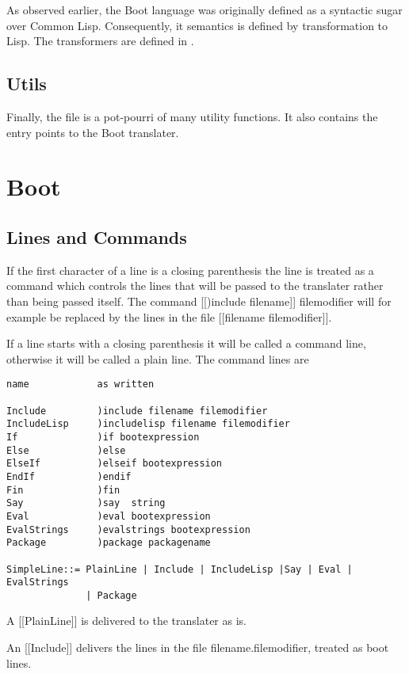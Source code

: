 \documentclass{article}
\begin{document}
As observed earlier, the Boot language was originally defined as a syntactic
sugar over Common Lisp.  Consequently, it semantics is defined by
transformation to Lisp.  The transformers are defined in
.

\subsection{Utils}
\label{sec:boot-to-cl:utils}

Finally, the file  is a pot-pourri of many utility
functions.  It also contains the entry points to the Boot translater.


\section{Boot}
\label{sec:boot}

\subsection{Lines and Commands}

If the first character of a line is a closing parenthesis the line
is treated as a command which controls the lines that will be
passed to the translater rather than being passed itself.
The command [[)include filename]] filemodifier will for example
be replaced by the lines in the file [[filename filemodifier]].

If a line starts with a closing parenthesis it will be called a command
line, otherwise it will be called a plain line.
The command lines are
\begin{verbatim}
name            as written

Include         )include filename filemodifier
IncludeLisp     )includelisp filename filemodifier
If              )if bootexpression
Else            )else
ElseIf          )elseif bootexpression
EndIf           )endif
Fin             )fin
Say             )say  string
Eval            )eval bootexpression
EvalStrings     )evalstrings bootexpression
Package         )package packagename

SimpleLine::= PlainLine | Include | IncludeLisp |Say | Eval | EvalStrings
              | Package
\end{verbatim}

A [[PlainLine]] is delivered to the translater as is.

An [[Include]] delivers the lines in the file filename.filemodifier,
treated as boot lines.
\end{document}
